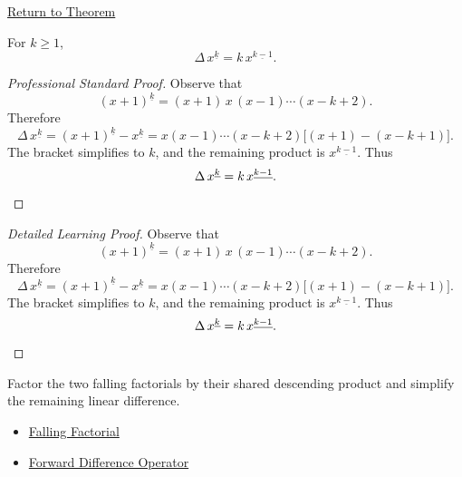 \newpage
{}
\label{prf:falling-factorial-rule}

\begin{remark*}[Return]
\hyperref[thm:falling-factorial-rule]{Return to Theorem}
\end{remark*}

\begin{theorem*}
For \(k \ge 1\),
\[
\Delta\, x^{\underline{k}} = k\,x^{\underline{k-1}}.
\]
\end{theorem*}

\begin{proof}[Professional Standard Proof]
\LRAProofBodyStart
Observe that
\[
(x+1)^{\underline{k}} = (x+1)\,x\,(x-1)\cdots(x-k+2).
\]
Therefore
\[
\Delta\, x^{\underline{k}}
= (x+1)^{\underline{k}} - x^{\underline{k}}
= x(x-1)\cdots(x-k+2)\bigl[(x+1)-(x-k+1)\bigr].
\]
The bracket simplifies to \(k\), and the remaining product is
\(x^{\underline{k-1}}\). Thus
\[
\Delta\, x^{\underline{k}} = k\,x^{\underline{k-1}}. \qedhere
\]
\end{proof}

\begin{proof}[Detailed Learning Proof]
\LRAProofBodyStart
Observe that
\[
(x+1)^{\underline{k}} = (x+1)\,x\,(x-1)\cdots(x-k+2).
\]
Therefore
\[
\Delta\, x^{\underline{k}}
= (x+1)^{\underline{k}} - x^{\underline{k}}
= x(x-1)\cdots(x-k+2)\bigl[(x+1)-(x-k+1)\bigr].
\]
The bracket simplifies to \(k\), and the remaining product is
\(x^{\underline{k-1}}\). Thus
\[
\Delta\, x^{\underline{k}} = k\,x^{\underline{k-1}}. \qedhere
\]
\end{proof}

\begin{remark*}
Factor the two falling factorials by their shared descending product and
simplify the remaining linear difference.
\end{remark*}

\begin{dependencies}
\begin{itemize}
  \item \hyperref[def:falling-factorial]{Falling Factorial}
  \item \hyperref[def:forward-difference]{Forward Difference Operator}
\end{itemize}
\end{dependencies}
\clearpage
